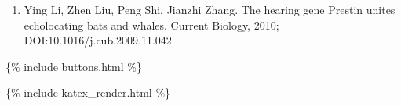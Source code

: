 \begin{enumerate}
\def\labelenumi{\arabic{enumi}.}
\itemsep1pt\parskip0pt
\item
  Ying Li, Zhen Liu, Peng Shi, Jianzhi Zhang. The hearing gene Prestin
  unites echolocating bats and whales. Current Biology, 2010;
  DOI:10.1016/j.cub.2009.11.042
\end{enumerate}

\{\% include buttons.html \%\}

\{\% include katex\_render.html \%\}
